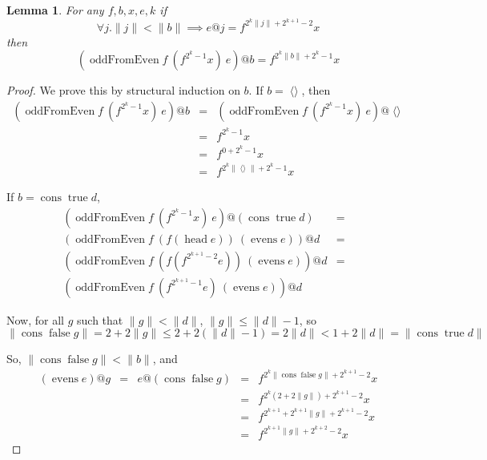 \documentclass{article}
\DeclareMathOperator{\oddFrom}{oddFromEven}
\DeclareMathOperator{\nil}{\langle\rangle}
\DeclareMathOperator{\cons}{cons}
\DeclareMathOperator{\true}{true}
\DeclareMathOperator{\false}{false}
\DeclareMathOperator{\head}{head}
\DeclareMathOperator{\evens}{evens}
\newcommand{\ord}[1]{\|#1\|}
\newtheorem{lemma}[theorem]{Lemma}
\begin{document}
\begin{lemma}
For any $f, b, x, e, k$
if
\begin{displaymath}
\forall j . \ord{j} < \ord{b} \implies e@j = f^{2^k\ord{j}+2^{k+1}-2}x
\end{displaymath}
then
\begin{displaymath}
(\oddFrom f\ (f^{2^k-1}x)\ e)@b = f^{2^k\ord{b}+2^k-1}x
\end{displaymath}
\end{lemma}
\begin{proof}
We prove this by structural induction on $b$. If $b = \nil$, then 
\begin{displaymath}
\begin{array}{rcl}
(\oddFrom f\ (f^{2^k-1}x)\ e)@b & = & (\oddFrom f\ (f^{2^k-1}x)\ e)@\nil \\
& = & f^{2^k-1}x \\
& = & f^{0+2^k-1}x \\
& = & f^{2^k\ord{\nil}+2^k-1}x
\end{array}
\end{displaymath}

If $b = \cons \true d$,
\begin{displaymath}
\begin{array}{rcl}
(\oddFrom f\ (f^{2^k-1}x)\ e)@(\cons \true d)& = & \\
(\oddFrom f\ (f (\head e))\ (\evens e))@d& = & \\
(\oddFrom f\ (f (f^{2^{k+1}-2}e))\ (\evens e))@d& = & \\
(\oddFrom f\ (f^{2^{k+1}-1}e)\ (\evens e))@d&  & 
\end{array}
\end{displaymath}

Now, for all $g$ such that $\ord{g} < \ord{d}$, $\ord{g} \leq \ord{d}-1$, so 
\begin{displaymath}
\ord{\cons \false g} = 2 + 2\ord{g} \leq 2 + 2(\ord{d} -1) = 2\ord{d} < 1+2\ord{d} = \ord{\cons \true d}
\end{displaymath}

So, $\ord{\cons \false g} < \ord{b}$, and 
\begin{displaymath}
\begin{array}{rcccl}
(\evens e)@g & = & e@(\cons \false g) & = & f^{2^k\ord{\cons \false g}+2^{k+1}-2}x \\
& & & = & f^{2^k(2+2\ord{g})+2^{k+1}-2}x \\
& & & = & f^{2^{k+1} + 2^{k+1}\ord{g}+2^{k+1}-2}x \\
& & & = & f^{2^{k+1}\ord{g}+2^{k+2}-2}x 
\end{array}
\end{displaymath}


\end{proof}
\end{document}
